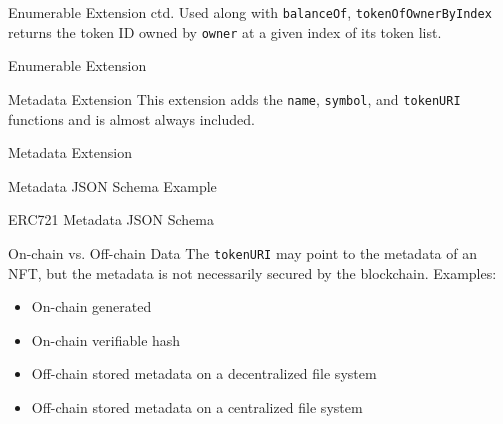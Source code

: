 \documentclass[handout]{beamer}
\begin{document}
\begin{frame}{Enumerable Extension ctd.}
	Used along with \texttt{balanceOf}, \texttt{tokenOfOwnerByIndex} returns the token ID owned by \texttt{owner} at a given index of its token list.\vspace{0.5em}
 
	\begin{samplecode}{Enumerable Extension}
		
	\end{samplecode}

\end{frame}

\begin{frame}{Metadata Extension}
	This extension adds the \texttt{name}, \texttt{symbol}, and \texttt{tokenURI} functions and is almost always included.
\vspace{0.5em}
	\begin{samplecode}{Metadata Extension}
		
	\end{samplecode}
\vspace{0.5em}
\end{frame}

\begin{frame}{Metadata JSON Schema Example}
	\begin{samplecode}{ERC721 Metadata JSON Schema}
		
	\end{samplecode}
\end{frame}

\begin{frame}{On-chain vs. Off-chain Data}
	The \texttt{tokenURI} may point to the metadata of an NFT, but the metadata is not necessarily secured by the blockchain. Examples:\\

	\begin{itemize}
		\item<2-> On-chain generated
		\item<3-> On-chain verifiable hash
		\item<4-> Off-chain stored metadata on a decentralized file system
		\item<5-> Off-chain stored metadata on a centralized file system
	\end{itemize}
\end{frame}
\end{document}
